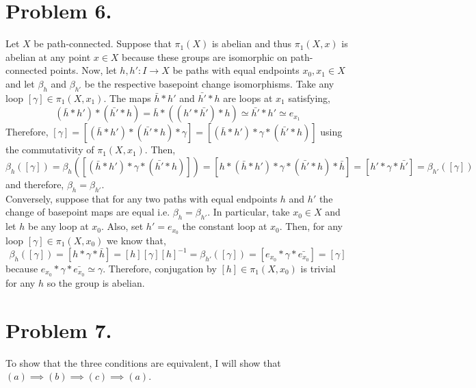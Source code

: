 \documentclass[12pt]{extarticle}
\begin{document}
\section*{Problem 6.}
Let $X$ be path-connected. Suppose that $\pi_1(X)$ is abelian and thus $\pi_1(X, x)$ is abelian at any point $x \in X$ because these groups are isomorphic on path-connected points. Now, let $h, h' : I \to X$ be paths with equal endpoints $x_0, x_1 \in X$ and let $\beta_h$ and $\beta_{h'}$ be the respective basepoint change isomorphisms. Take any loop $[\gamma] \in \pi_1(X, x_1)$. The maps $\bar{h} * h'$ and $\bar{h'} * h$ are loops at $x_1$ satisfying, \[(\bar{h} * h') * (\bar{h'} * h) = \bar{h} * ((h' * \bar{h'}) * h) \simeq \bar{h'} * h' \simeq e_{x_1}\]    
Therefore, $[\gamma] = [(\bar{h} * h') * (\bar{h'} * h) * \gamma] = [(\bar{h} * h') * \gamma * (\bar{h'} * h)]$ using the commutativity of $\pi_1(X, x_1)$. Then,
\[\beta_h([\gamma]) = \beta_h([(\bar{h} * h') * \gamma * (\bar{h'} * h)]) = [h *(\bar{h} * h') * \gamma * (\bar{h'} * h) * \bar{h}] = [h' * \gamma * \bar{h'}] = \beta_{h'}([\gamma])\]
and therefore, $\beta_h = \beta_{h'}$. \bigskip \\
Conversely, suppose that for any two paths with equal endpoints $h$ and $h'$ the change of basepoint maps are equal i.e. $\beta_h = \beta_{h'}$. In particular, take $x_0 \in X$ and let $h$ be any loop at $x_0$. Also, set $h' = e_{x_0}$ the constant loop at $x_0$. Then, for any loop $[\gamma] \in \pi_1(X, x_0)$ we know that,
\[ \beta_h([\gamma]) = [h * \gamma * \bar{h}] = [h] [\gamma] [h]^{-1} = \beta_{h'}([\gamma]) = [e_{x_0} * \gamma * \bar{e_{x_0}}] = [\gamma]\]
because $e_{x_0} * \gamma * \bar{e_{x_0}} \simeq \gamma$. Therefore, conjugation by $[h] \in \pi_1(X, x_0)$ is trivial for any $h$ so the group is abelian.
\section*{Problem 7.}

To show that the three conditions are equivalent, I will show that $(a) \implies (b) \implies (c) \implies (a)$. \bigskip \\
\end{document}
